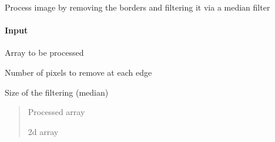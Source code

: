 \documentclass[letterpaper,10pt,english]{sphinxmanual}
\begin{document}
\begin{fulllineitems}
\label{\detokenize{api/pymusepipe:pymusepipe.util_image.filtermed_image}}
\pysigstartsignatures
{}
\pysigstopsignatures
\sphinxAtStartPar
Process image by removing the borders
and filtering it via a median filter


\paragraph{Input}
\label{\detokenize{api/pymusepipe:id144}}\begin{description}
\sphinxAtStartPar
Array to be processed

\sphinxAtStartPar
Number of pixels to remove at each edge

\sphinxAtStartPar
Size of the filtering (median)

\end{description}
\begin{quote}\begin{description}
\sphinxAtStartPar
{} \textendash{} Processed array

\sphinxAtStartPar
2d array

\end{description}\end{quote}

\end{fulllineitems}

\end{document}
